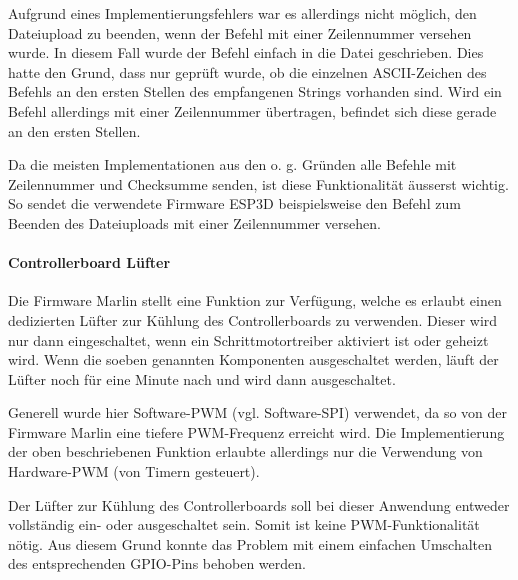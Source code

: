 Aufgrund eines Implementierungsfehlers war es allerdings nicht möglich, den Dateiupload zu beenden, wenn der Befehl mit einer Zeilennummer versehen wurde. In diesem Fall wurde der Befehl einfach in die Datei geschrieben. Dies hatte den Grund, dass nur geprüft wurde, ob die einzelnen ASCII-Zeichen des Befehls an den ersten Stellen des empfangenen Strings vorhanden sind. Wird ein Befehl allerdings mit einer Zeilennummer übertragen, befindet sich diese gerade an den ersten Stellen.

Da die meisten Implementationen aus den o. g. Gründen alle Befehle mit Zeilennummer und Checksumme senden, ist diese Funktionalität äusserst wichtig. So sendet die verwendete Firmware ESP3D beispielsweise den Befehl zum Beenden des Dateiuploads mit einer Zeilennummer versehen.

\paragraph{Controllerboard Lüfter}
Die Firmware Marlin stellt eine Funktion zur Verfügung, welche es erlaubt einen dedizierten Lüfter zur Kühlung des Controllerboards zu verwenden. Dieser wird nur dann eingeschaltet, wenn ein Schrittmotortreiber aktiviert ist oder geheizt wird. Wenn die soeben genannten Komponenten ausgeschaltet werden, läuft der Lüfter noch für eine Minute nach und wird dann ausgeschaltet.

Generell wurde hier Software-PWM (vgl. Software-SPI) verwendet, da so von der Firmware Marlin eine tiefere PWM-Frequenz erreicht wird. Die Implementierung der oben beschriebenen Funktion erlaubte allerdings nur die Verwendung von Hardware-PWM (von Timern gesteuert).

Der Lüfter zur Kühlung des Controllerboards soll bei dieser Anwendung entweder vollständig ein- oder ausgeschaltet sein. Somit ist keine PWM-Funktionalität nötig. Aus diesem Grund konnte das Problem mit einem einfachen Umschalten des entsprechenden GPIO-Pins behoben werden.
